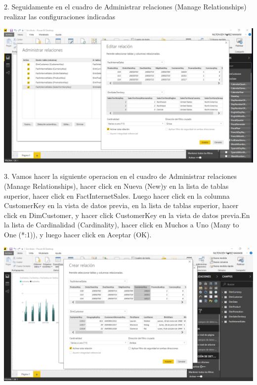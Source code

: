 \begin{itemize}
2. Seguidamente en el cuadro de Administrar relaciones (Manage Relationships) realizar las configuraciones indicadas 
\end{itemize} 

\begin{center}
\includegraphics[width=15cm]{./Imagenes/Imagen2} 
\end{center}

\begin{itemize}
3. Vamos hacer la siguiente operacion en el cuadro de Administrar relaciones (Manage Relationships), hacer click en Nueva (New)y en la lista de tablas superior, hacer click en FactInternetSales. Luego hacer click en la columna
CustomerKey en la vista de datos previa, en la lista de tablas superior, hacer click en DimCustomer, y hacer click CustomerKey en la vista de datos previa.En la lista de Cardinalidad (Cardinality), hacer click en Muchos a Uno (Many to One (*:1)), y luego hacer
click en Aceptar (OK).

\end{itemize} 

\begin{center}
\includegraphics[width=15cm]{./Imagenes/Imagen3} 
\end{center}


